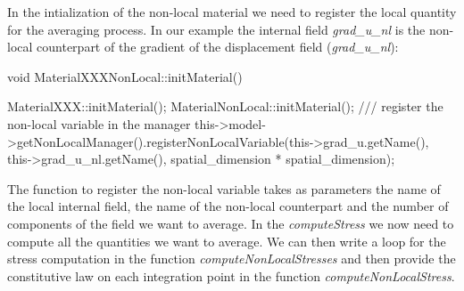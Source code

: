 In the intialization of the non-local material we need to register the local quantity for the averaging process. In our example the internal field \emph{grad\_u\_nl} is the non-local counterpart of the gradient of the displacement field (\emph{grad\_u\_nl}):
\begin{cpp}
  void MaterialXXXNonLocal::initMaterial() {
    MaterialXXX::initMaterial();
    MaterialNonLocal::initMaterial();
    /// register the non-local variable in the manager
    this->model->getNonLocalManager().registerNonLocalVariable(this->grad_u.getName(), this->grad_u_nl.getName(), spatial_dimension * spatial_dimension);

}
\end{cpp}
The function to register the non-local variable takes as parameters the name of the local internal field, the name of the non-local counterpart and the number of components of the field we want to average.
In the \emph{computeStress} we now need to compute all the quantities we want to average. We can then write a loop for the stress computation in the function \emph{computeNonLocalStresses} and then provide the constitutive law on each integration point in the function \emph{computeNonLocalStress}.



